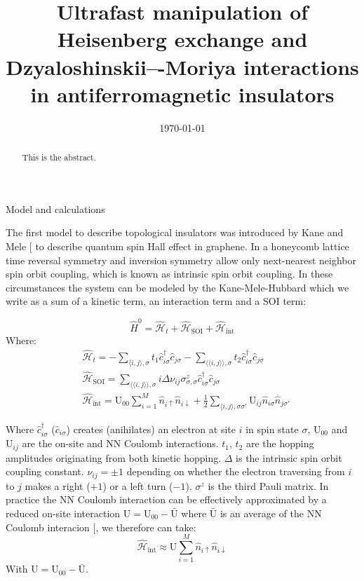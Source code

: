 \documentclass[aps,prl,twocolumn,amsmath,amssymb,superscriptaddress,nobibnotes]{revtex4}%
\renewcommand{\cite}[1]{{[}\onlinecite{#1}{]}}
\begin{document}
\title{Ultrafast manipulation of Heisenberg exchange and Dzyaloshinskii–-Moriya interactions in antiferromagnetic insulators}


\begin{abstract}
This is the abstract.
\end{abstract}

\date{\today}
\maketitle

\begin{section}{Model and calculations}

The first model to describe topological insulators was introduced by Kane and Mele \cite{Kane2005} to describe quantum spin Hall effect in graphene. In a honeycomb lattice time reversal symmetry and inversion symmetry allow only next-nearest neighbor spin orbit coupling, which is known as intrinsic spin orbit coupling. In these circumstances the system can be modeled by the Kane-Mele-Hubbard which we write as a sum of a kinetic term, an interaction term and a SOI term:

\begin{equation}
\label{MKMH}
\hat{H}^0 = \hat{\mathcal{H}}_t + \hat{\mathcal{H}}_{\text{SOI}} + \hat{\mathcal{H}}_{\text{int}}
\end{equation}
Where:
\begin{align}
&\hat{\mathcal{H}}_t = - \sum_{\langle i,j \rangle, \sigma} t_1\hat{c}_{i \sigma}^\dagger \hat{c}_{j \sigma} - \sum_{\langle \langle i,j \rangle \rangle, \sigma} t_2\hat{c}_{i \sigma}^\dagger \hat{c}_{j \sigma} \\
&\hat{\mathcal{H}}_{\text{SOI}} = \sum_{\langle \langle i,j \rangle \rangle, \sigma} i\Delta\nu_{ij}\sigma^z_{\sigma, \sigma}\hat{c}_{i \sigma}^\dagger \hat{c}_{j \sigma} \\
&\hat{\mathcal{H}}_{\text{int}} = \text{U}_{00}\sum_{i=1}^M \hat{n}_{i\uparrow}\hat{n}_{i\downarrow} + \frac{1}{2}\sum_{\langle i,j \rangle, \sigma \sigma'} \text{U}_{ij}\hat{n}_{i\sigma}\hat{n}_{j\sigma'}
\end{align}

Where $\hat{c}_{i \sigma}^\dagger$ ($ \hat{c}_{i \sigma}$) creates (anihilates) an electron at site $i$ in spin state $\sigma$, $\text{U}_{00}$ and $\text{U}_{ij}$ are the on-site and NN Coulomb interactions. $t_1$, $t_2$ are the hopping amplitudes originating from both kinetic hopping. $\Delta$ is the intrinsic spin orbit coupling constant. $\nu_{ij}=\pm 1$ depending on whether the electron traversing from $i$ to $j$ makes a right ($+1$) or a left turn ($-1$). $\sigma^{z}$ is the third Pauli matrix. 
In practice the NN Coulomb interaction can be effectively approximated by a reduced on-site interaction $\text{U} = \text{U}_{00} - \bar{\text{U}}$ where $\bar{\text{U}}$ is an average of the NN Coulomb interacion \cite{Schuler2013}, we therefore can take:
\begin{equation}
\hat{\mathcal{H}}_{\text{int}} \approx \text{U}\sum_{i=1}^M \hat{n}_{i\uparrow}\hat{n}_{i\downarrow}
\end{equation}
With $\text{U} = \text{U}_{00} - \bar{\text{U}}$.


\end{section}
\end{document}
